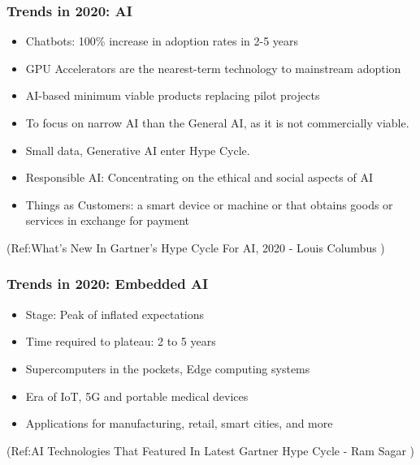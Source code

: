 \begin{frame}[fragile]\frametitle{Trends in 2020: AI}

\begin{itemize}
\item Chatbots: 100\% increase in adoption rates in 2-5 years
\item GPU Accelerators are the nearest-term technology to mainstream adoption
\item AI-based minimum viable products replacing pilot projects 
\item To focus on narrow AI than the General AI, as it is not commercially viable.
\item Small data, Generative AI  enter Hype Cycle.
\item Responsible AI: Concentrating on the ethical and social aspects of AI
\item Things as Customers: a smart device or machine or that obtains goods or services in exchange for payment
\end{itemize}


{\tiny (Ref:What’s New In Gartner’s Hype Cycle For AI, 2020 - 
Louis Columbus )}

\end{frame}

\begin{frame}[fragile]\frametitle{Trends in 2020: Embedded AI}
\begin{itemize}
\item Stage: Peak of inflated expectations
\item Time required to plateau: 2 to 5 years
\item Supercomputers in the pockets, Edge computing systems
\item Era of IoT, 5G and portable medical devices
\item Applications for manufacturing, retail, smart cities, and more
\end{itemize}


{\tiny (Ref:AI Technologies That Featured In Latest Gartner Hype Cycle - 
Ram Sagar )}

\end{frame}

